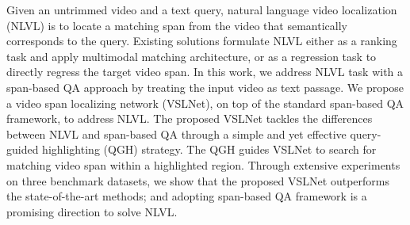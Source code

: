 Given an untrimmed video and a text query, natural language video localization (NLVL) is to locate a matching span from the video that semantically corresponds to the query. Existing solutions formulate NLVL either as a ranking task and apply multimodal matching architecture, or as a regression task to directly regress the target video span. In this work, we address NLVL task with a span-based QA approach by treating the input video as text passage. We propose a video span localizing network (VSLNet), on top of the standard span-based QA framework, to address NLVL. The proposed VSLNet tackles the differences between NLVL and span-based QA through a simple and yet effective query-guided highlighting (QGH) strategy. The QGH guides VSLNet to search for matching video span within a highlighted region. Through extensive experiments on three benchmark datasets, we show that the proposed VSLNet outperforms the state-of-the-art methods; and adopting span-based QA framework is a promising direction to solve NLVL.
